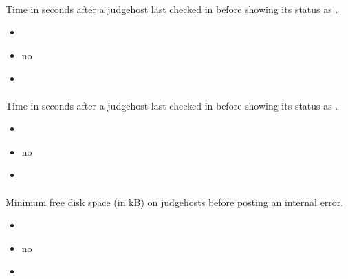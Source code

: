\documentclass[a4paper,10pt,english,openany]{sphinxmanual}
\begin{document}
\paragraph{}
\label{\detokenize{configuration-reference:judgehost-warning}}
\sphinxAtStartPar
Time in seconds after a judgehost last checked in before showing its status as .
\begin{itemize}
\item {} 
\sphinxAtStartPar
{} 

\item {} 
\sphinxAtStartPar
{} no

\item {} 
\sphinxAtStartPar
{} 

\end{itemize}


\paragraph{}
\label{\detokenize{configuration-reference:judgehost-critical}}
\sphinxAtStartPar
Time in seconds after a judgehost last checked in before showing its status as .
\begin{itemize}
\item {} 
\sphinxAtStartPar
{} 

\item {} 
\sphinxAtStartPar
{} no

\item {} 
\sphinxAtStartPar
{} 

\end{itemize}


\paragraph{}
\label{\detokenize{configuration-reference:diskspace-error}}
\sphinxAtStartPar
Minimum free disk space (in kB) on judgehosts before posting an internal error.
\begin{itemize}
\item {} 
\sphinxAtStartPar
{} 

\item {} 
\sphinxAtStartPar
{} no

\item {} 
\sphinxAtStartPar
{} 

\end{itemize}
\end{document}
